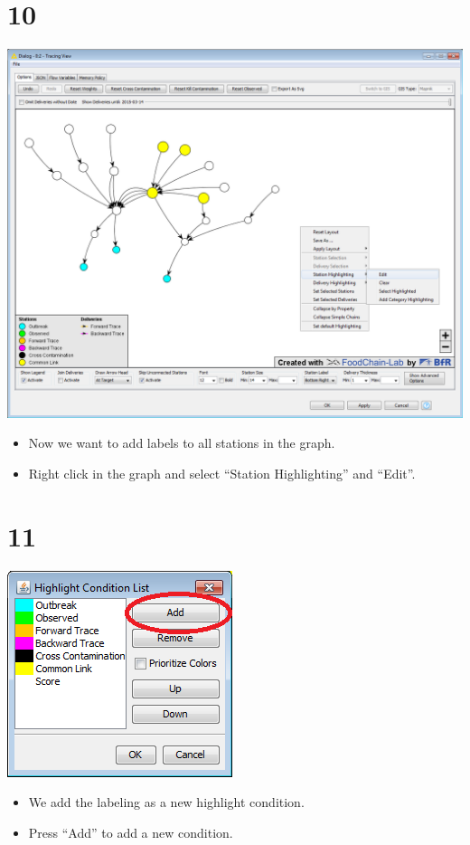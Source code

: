 \documentclass[10pt]{beamer}
\begin{document}
\section{10}
\begin{frame}
	\begin{center}
  		\includegraphics[height=0.6\textheight]{10.png}
	\end{center}
	\begin{itemize}
		\item Now we want to add labels to all stations in the graph.
		\item Right click in the graph and select ``Station Highlighting'' and ``Edit''.
	\end{itemize}
\end{frame}

\section{11}
\begin{frame}
	\begin{center}
  		\includegraphics[scale=0.6]{11.png}
	\end{center}
	\begin{itemize}
		\item We add the labeling as a new highlight condition.
		\item Press ``Add'' to add a new condition.
	\end{itemize}
\end{frame}
\end{document}

